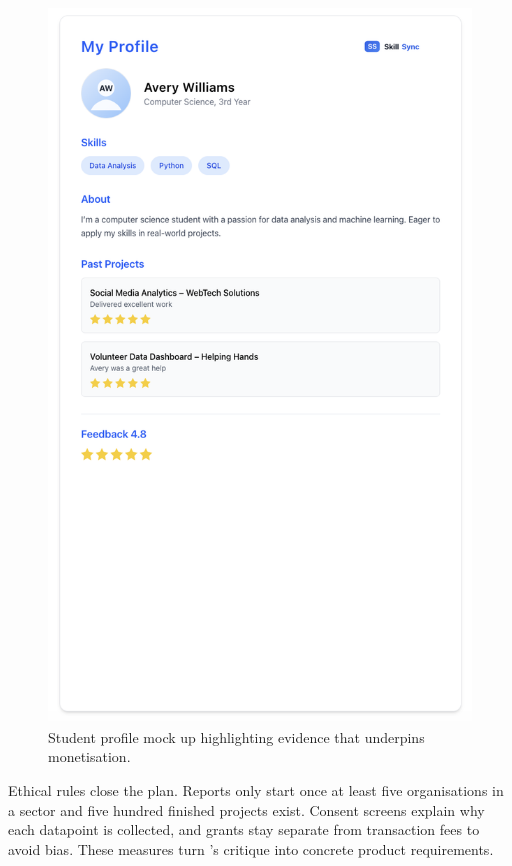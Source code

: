 \begin{figure}[H]
  \centering
  \includegraphics[width=0.8\linewidth]{figures/Student-Profile.png}
  \caption{Student profile mock up highlighting evidence that underpins monetisation.}
  \label{fig:student-profile}
\end{figure}

Ethical rules close the plan. Reports only start once at least five organisations in a sector and five hundred finished projects exist. Consent screens explain why each datapoint is collected, and grants stay separate from transaction fees to avoid bias. These measures turn \citet{Zuboff2019}’s critique into concrete product requirements.